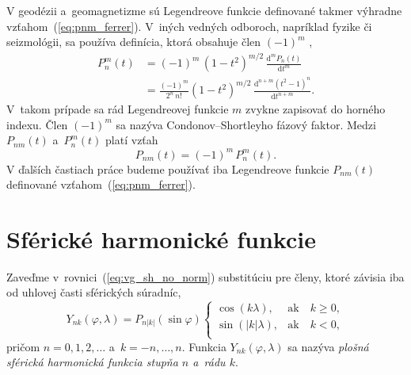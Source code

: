 \documentclass[a4paper, 12pt]{book}
\newcommand{\diff}{\mathrm d}
\begin{document}
V geodézii a~geomagnetizme sú Legendreove funkcie definované takmer výhradne 
vzťahom~(\ref{eq:pnm_ferrer}).  V~iných vedných odboroch, napríklad fyzike či 
seizmológii, sa používa definícia, ktorá obsahuje člen $(-1)^m$ 
\parencite[pozri][]{Wieczorek2015,Olver2010},
%
\begin{equation}
\begin{split}
P_n^m(t) &= (-1)^m \, (1 - t^2)^{m \slash 2} \, \frac{\diff^m P_n(t)}{\diff 
t^m}\\
%
&= \frac{(-1)^m}{2^n \, n!} (1 - t^2)^{ m \slash 2} \, \frac{\diff^{n + m}
(t^2 - 1)^n}{\diff t^{n + m}}{.}
\end{split}
\end{equation}
%
V~takom prípade sa rád Legendreovej funkcie $m$ zvykne zapisovať do horného 
indexu.  Člen $(-1)^{m}$ sa nazýva Condonov--Shortleyho fázový faktor.  Medzi 
$P_{nm}(t)$ a~$P_n^m(t)$ platí vzťah
%
\begin{equation}
P_{nm}(t) = (-1)^m \, P_n^m(t){.}
\end{equation}
%
V ďalších častiach práce budeme používať iba Legendreove funkcie $P_{nm}(t)$ 
definované vzťahom~(\ref{eq:pnm_ferrer}).




\section{Sférické harmonické funkcie}
\label{sec:spherical_harmonics}

Zaveďme v~rovnici~(\ref{eq:vg_sh_no_norm}) substitúciu pre členy, ktoré závisia
iba od uhlovej časti sférických súradníc,
%
\begin{equation}
\label{eq:ynk_no_norm}
Y_{nk}(\varphi, \lambda) = P_{n|k|}(\sin\varphi)
%
\begin{cases}
\cos(k\lambda){,}    &\text{ak} \quad k \geq 0{,}\\
\sin(|k|\lambda){,}  &\text{ak} \quad k < 0{,}\\
\end{cases}
\end{equation}
%
pričom $n = 0, 1, 2, \dots$ a~$k = -n, \dots, n$.  Funkcia $Y_{nk}(\varphi,
\lambda)$ sa nazýva \emph{plošná sférická harmonická funkcia stupňa $n$ a~rádu
$k$}.
\end{document}
